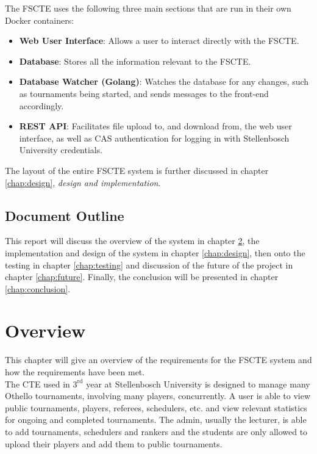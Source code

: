 \documentclass[a4paper, 12pt]{report}
\begin{document}
The FSCTE uses the following three main sections that are run in their own
Docker containers:

\begin{itemize}
	\item \textbf{Web User Interface}: Allows a user to interact directly with
	the FSCTE.
	\item \textbf{Database}: Stores all the information relevant to the FSCTE.
	\item \textbf{Database Watcher (Golang)}: Watches the database for any changes,
	such as tournaments being started, and sends messages to the front-end
	accordingly.
	\item \textbf{REST API}: Facilitates file upload to, and download from, the
	web user interface, as well as CAS authentication for logging in with
	Stellenbosch University credentials.
\end{itemize}

The layout of the entire FSCTE system is further discussed in chapter
\ref{chap:design}, \emph{design and implementation}.

\section{Document Outline}

This report will discuss the overview of the system in chapter \ref{chap:overview},
the implementation and design of the system in chapter \ref{chap:design}, then
onto the testing in chapter \ref{chap:testing} and discussion of the future of
the project in chapter \ref{chap:future}. Finally, the conclusion will be
presented in chapter \ref{chap:conclusion}.

\chapter{Overview}
\label{chap:overview}

This chapter will give an overview of the requirements for the FSCTE system and
how the requirements have been met. \\

The CTE used in $3^{\text{rd}}$ year at Stellenbosch
University is designed to manage many Othello \cite{othello} tournaments,
involving many players, concurrently. A user is able to view public tournaments,
players, referees, schedulers, etc. and view relevant statistics for
ongoing and completed tournaments. The admin, usually the lecturer, is
able to add tournaments, schedulers and rankers and the students are only allowed
to upload their players and add them to public tournaments.
\end{document}
